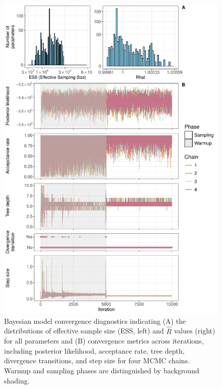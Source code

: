 \documentclass{article}
\begin{document}
\clearpage
\begin{figure}[tbhp] 
\centering
\includegraphics[width=14.2cm]{../../Plots/Supplementary Figure 3.pdf}  
\caption{Bayesian model convergence diagnostics indicating (A) the distributions of effective sample size (ESS, left) and $\hat{R}$ values (right) for all parameters and (B) convergence metrics across iterations, including posterior likelihood, acceptance rate, tree depth, divergence transitions, and step size for four MCMC chains. Warmup and sampling phases are distinguished by background shading.}
\label{fig:diagnostics}
\end{figure}

\end{document}
